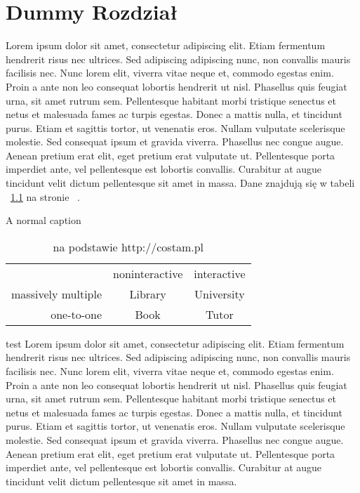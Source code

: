 \chapter{Dummy Rozdział}
Lorem ipsum dolor sit amet, consectetur adipiscing elit. Etiam fermentum hendrerit risus nec ultrices. Sed adipiscing adipiscing nunc, non convallis mauris facilisis nec. Nunc lorem elit, viverra vitae neque et, commodo egestas enim. Proin a ante non leo consequat lobortis hendrerit ut nisl. Phasellus quis feugiat urna, sit amet rutrum sem. Pellentesque habitant morbi tristique senectus et netus et malesuada fames ac turpis egestas. Donec a mattis nulla, et tincidunt purus. Etiam et sagittis tortor, ut venenatis eros. Nullam vulputate scelerisque molestie. Sed consequat ipsum et gravida viverra. Phasellus nec congue augue. Aenean pretium erat elit, eget pretium erat vulputate ut. Pellentesque porta imperdiet ante, vel pellentesque est lobortis convallis. Curabitur at augue tincidunt velit dictum pellentesque sit amet in massa. Dane znajdują się w tabeli ~\ref{tabela:testowa} na stronie ~\pageref{tabela:testowa}.
\begin{table}[h] %
	\caption{A normal caption}
	\begin{tabular}{ r|c|c| }
		\multicolumn{1}{r}{}
 		&  \multicolumn{1}{c}{noninteractive}
 		& \multicolumn{1}{c}{interactive} \\
		\cline{2-3}
		massively multiple & Library & University \\
		\cline{2-3}
		one-to-one & Book & Tutor \\
		\cline{2-3}
	\end{tabular}
	\caption*{na podstawie http://costam.pl}
	\label{tabela:testowa}
\end{table}
test \cite{abramowitz+stegun}
Lorem ipsum dolor sit amet, consectetur adipiscing elit. Etiam fermentum hendrerit risus nec ultrices. Sed adipiscing adipiscing nunc, non convallis mauris facilisis nec. Nunc lorem elit, viverra vitae neque et, commodo egestas enim. Proin a ante non leo consequat lobortis hendrerit ut nisl. Phasellus quis feugiat urna, sit amet rutrum sem. Pellentesque habitant morbi tristique senectus et netus et malesuada fames ac turpis egestas. Donec a mattis nulla, et tincidunt purus. Etiam et sagittis tortor, ut venenatis eros. Nullam vulputate scelerisque molestie. Sed consequat ipsum et gravida viverra. Phasellus nec congue augue. Aenean pretium erat elit, eget pretium erat vulputate ut. Pellentesque porta imperdiet ante, vel pellentesque est lobortis convallis. Curabitur at augue tincidunt velit dictum pellentesque sit amet in massa.

